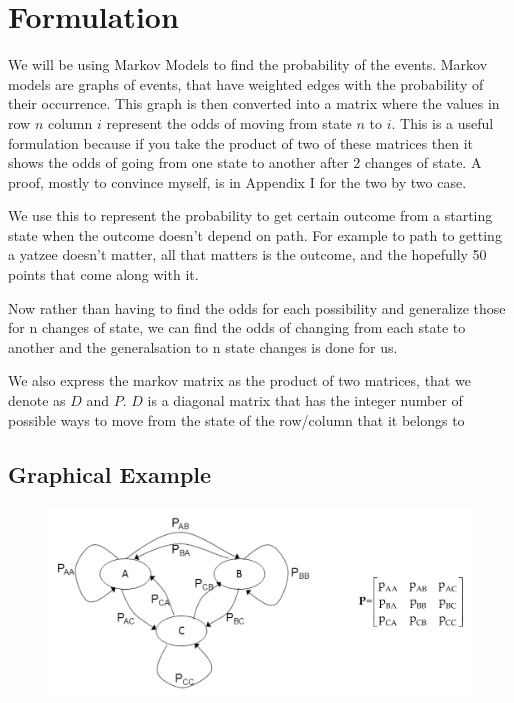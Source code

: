 \usepackage[utf8]{inputenc, graphixc, caption, fullpage}

\section{Formulation}
	
	We will be using Markov Models to find the probability of the events. 
Markov models are graphs of events, that have weighted edges with the probability of their occurrence. 
This graph is then converted into a matrix where the values in row $n$ column $i$ represent the odds of moving from state $n$ to $i$. 
This is a useful formulation because if you take the product of two of these matrices then it shows the odds of going from one state to another after 2 changes of state. 
A proof, mostly to convince myself, is in Appendix I for the two by two case.

We use this to represent the probability to get certain outcome from a starting state when the outcome doesn't depend on path. For example to path to getting a yatzee doesn't matter, all that matters is the outcome, and the hopefully 50 points that come along with it. 

Now rather than having to find the odds for each possibility and generalize those for n changes of state, we can find the odds of changing from each state to another and the generalsation to n state changes is done for us. 

We also express the markov matrix as the product of two matrices, that we denote as $D$ and $P$. $D$ is a diagonal matrix that has the integer number of possible ways to move from the state of the row/column that it belongs to

\subsection{Graphical Example}

\begin{figure}
  \includegraphics[width=\linewidth]{image11.jpeg}
  \label{Figure 1: Probability transition diagram for a 3-state Markov chain}
\end{figure}

